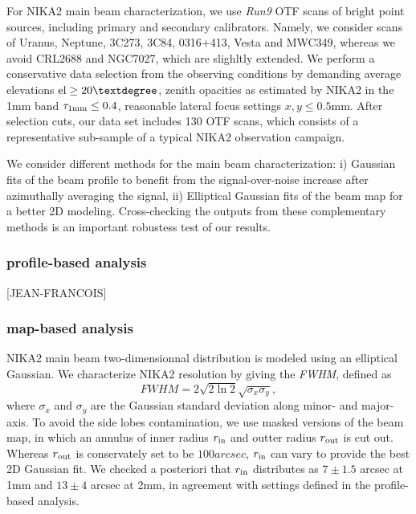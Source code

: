 For NIKA2 main beam characterization, we use \emph{Run9} OTF scans of bright point sources, including primary and secondary calibrators. Namely, we consider scans of Uranus, Neptune, 3C273, 3C84, 0316+413, Vesta and MWC349, whereas we avoid CRL2688 and NGC7027, which are slighltly extended. We perform a conservative data selection from the observing conditions by demanding average elevations $\rm{el} \ge 20°$, zenith opacities as estimated by NIKA2 in the 1mm band $\tau_{1\rm{mm}} \le 0.4$, reasonable lateral focus settings $x, y \le 0.5$mm. After selection cuts, our data set includes 130 OTF scans, which consists of a representative sub-sample of a typical NIKA2 observation campaign.    

  
We consider different methods for the main beam characterization: i) Gaussian fits of the beam profile to benefit from the signal-over-noise increase after azimuthally averaging the signal, ii) Elliptical Gaussian fits of the beam map for a better 2D modeling. Cross-checking the outputs from these complementary methods is an important robustess test of our results.   


\subsubsection{profile-based analysis}

[JEAN-FRANCOIS]

\subsubsection{map-based analysis}

NIKA2 main beam two-dimensionnal distribution is modeled using an elliptical Gaussian. We characterize NIKA2 resolution by giving the \emph{FWHM}, defined as
\begin{equation}
  FWHM = 2 \sqrt{2\ln {2}} \sqrt{\sigma_x\sigma_y},
\end{equation}
where $\sigma_x$ and $\sigma_y$ are the Gaussian standard deviation along minor- and major-axis. To avoid the side lobes contamination, we use masked versions of the beam map, in which an annulus of inner radius $r_{\rm{in}}$ and outter radius $r_{\rm{out}}$ is cut out. Whereas $r_{\rm{out}}$ is conservately set to be $100 arcsec$, $r_{\rm{in}}$ can vary to provide the best 2D Gaussian fit. We checked a posteriori that $r_{\rm{in}}$ distributes as $7 \pm 1.5$ arcsec at 1mm and $13 \pm 4$ arcsec at 2mm, in agreement with settings defined in the profile-based analysis.   


